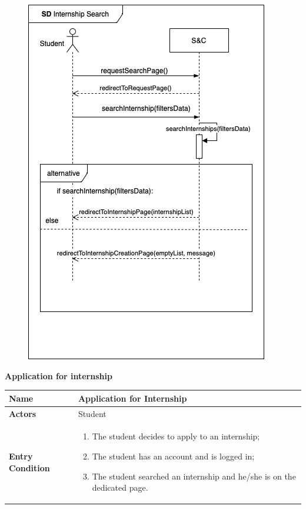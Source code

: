 \begin{enumerate}[label=\textbf{[US\arabic*]}, left = 0pt, align = left, resume]
            \newpage
            \begin{figure}[h!]
                \centering  \includegraphics[]{RASD/Images/UseCases/InternshipSearch.drawio.png}
                \label{fig:CompleteStudentProfile}
            \end{figure}

            \newpage
            \item \textbf{Application for internship}
            
            \begin{longtable}{|l|p{11cm}|}  
                \hline
                \textbf{Name} & 
                    \textbf{Application for Internship} \\
                \hline
                
                \textbf{Actors} & 
                    Student \\
                \hline
                
                \textbf{Entry Condition} & 
                    \begin{enumerate}[label=\textbullet, itemsep=0em]
                        \item The student decides to apply to an internship;
                        \item The student has an account and is logged in;
                        \item The student searched an internship and he/she is on the dedicated page.
                    \end{enumerate} \\
                \hline
                

\end{longtable}
\end{enumerate}
